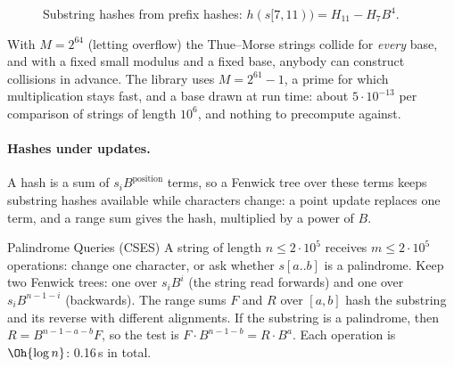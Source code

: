 \begin{figure}[htbp]
\centering
{}
\caption{Substring hashes from prefix hashes: $h(s[7, 11)) = H_{11} - H_7 B^4$.}
\label{fig:strhash}
\end{figure}


\begin{pitfall}
With $M = 2^{64}$ (letting  overflow) the Thue--Morse strings collide for \emph{every} base, and with a fixed
small modulus and a fixed base, anybody can construct collisions in advance. The library uses $M = 2^{61} - 1$, a prime for which
multiplication stays fast, and a base drawn at run time: about $5 \cdot 10^{-13}$ per comparison of strings of length $10^6$, and
nothing to precompute against.
\end{pitfall}

\paragraph{Hashes under updates.} A hash is a sum of $s_i B^{\text{position}}$ terms, so a Fenwick tree over these terms keeps substring
hashes available while characters change: a point update replaces one term, and a range sum gives the hash, multiplied by a power of $B$.

\begin{problem}{Palindrome Queries (CSES)}
A string of length $n \le 2 \cdot 10^5$ receives $m \le 2 \cdot 10^5$ operations: change one character, or ask whether $s[a..b]$ is a
palindrome.
\solution Keep two Fenwick trees: one over $s_i B^i$ (the string read forwards) and one over $s_i B^{n-1-i}$ (backwards). The range
sums $F$ and $R$ over $[a, b]$ hash the substring and its reverse with different alignments. If the substring is a palindrome, then
$R = B^{n-1-a-b} F$, so the test is $F \cdot B^{n-1-b} = R \cdot B^{a}$. Each operation is $\Oh{\log n}$: 0.16\,s in total.
\end{problem}

